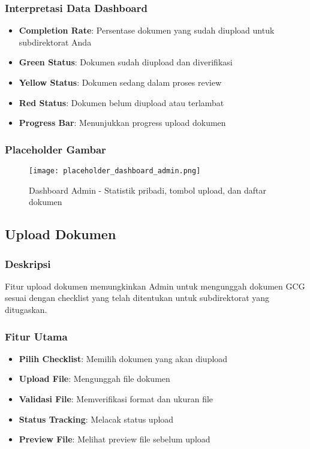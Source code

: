 \documentclass[12pt,a4paper]{article}
\begin{document}
\subsubsection{Interpretasi Data Dashboard}
\begin{itemize}
\item \textbf{Completion Rate}: Persentase dokumen yang sudah diupload untuk subdirektorat Anda
\item \textbf{Green Status}: Dokumen sudah diupload dan diverifikasi
\item \textbf{Yellow Status}: Dokumen sedang dalam proses review
\item \textbf{Red Status}: Dokumen belum diupload atau terlambat
\item \textbf{Progress Bar}: Menunjukkan progress upload dokumen
\end{itemize}

\subsubsection{Placeholder Gambar}
\begin{figure}[H]
\centering
\texttt{[image: placeholder\_dashboard\_admin.png]}
\caption{Dashboard Admin - Statistik pribadi, tombol upload, dan daftar dokumen}
\label{fig:dashboard_admin}
\end{figure}

\subsection{Upload Dokumen}

\subsubsection{Deskripsi}
Fitur upload dokumen memungkinkan Admin untuk mengunggah dokumen GCG sesuai dengan checklist yang telah ditentukan untuk subdirektorat yang ditugaskan.

\subsubsection{Fitur Utama}
\begin{itemize}
\item \textbf{Pilih Checklist}: Memilih dokumen yang akan diupload
\item \textbf{Upload File}: Mengunggah file dokumen
\item \textbf{Validasi File}: Memverifikasi format dan ukuran file
\item \textbf{Status Tracking}: Melacak status upload
\item \textbf{Preview File}: Melihat preview file sebelum upload
\end{itemize}
\end{document}
